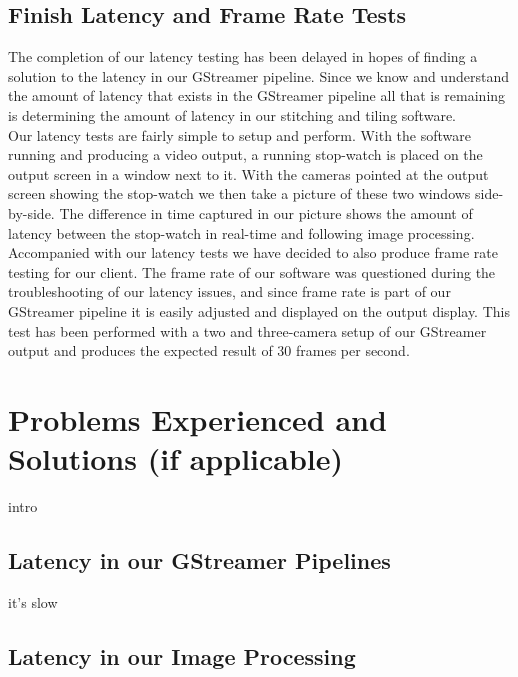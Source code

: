 \documentclass[letterpaper,10pt,serif,draftclsnofoot,onecolumn,compsoc,titlepage]{IEEEtran}
\begin{document}
\subsection{Finish Latency and Frame Rate Tests}

The completion of our latency testing has been delayed in hopes of finding a solution to 
the latency in our GStreamer pipeline. Since we know and understand the amount of latency 
that exists in the GStreamer pipeline all that is remaining is determining the amount of 
latency in our stitching and tiling software. \\

Our latency tests are fairly simple to setup and perform. With the software running and 
producing a video output, a running stop-watch is placed on the output screen in a window 
next to it. With the cameras pointed at the output screen showing the stop-watch we then 
take a picture of these two windows side-by-side. The difference in time captured in our 
picture shows the amount of latency between the stop-watch in real-time and following 
image processing. \\

Accompanied with our latency tests we have decided to also produce frame rate testing for 
our client. The frame rate of our software was questioned during the troubleshooting of 
our latency issues, and since frame rate is part of our GStreamer pipeline it is easily 
adjusted and displayed on the output display. This test has been performed with a two and 
three-camera setup of our GStreamer output and produces the expected result of 30 frames 
per second.  \\

\section{Problems Experienced and Solutions (if applicable)}

intro\\

\subsection{Latency in our GStreamer Pipelines}

it's slow \\

\subsection{Latency in our Image Processing}
\end{document}
